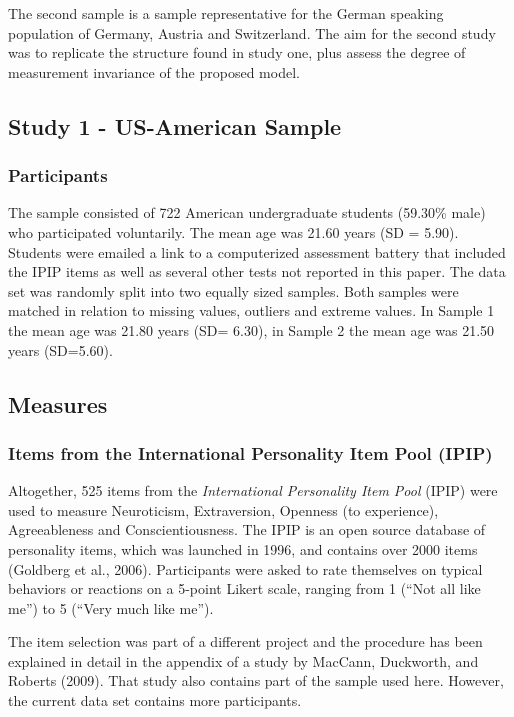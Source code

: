 \documentclass[,man,floatsintext]{apa6}
\begin{document}
The second sample is a sample representative for the German speaking
population of Germany, Austria and Switzerland. The aim for the second
study was to replicate the structure found in study one, plus assess the
degree of measurement invariance of the proposed model.

\subsection{Study 1 - US-American
Sample}\label{study-1---us-american-sample}

\subsubsection{Participants}\label{participants}

The sample consisted of 722 American undergraduate students (59.30\%
male) who participated voluntarily. The mean age was 21.60 years (SD =
5.90). Students were emailed a link to a computerized assessment battery
that included the IPIP items as well as several other tests not reported
in this paper. The data set was randomly split into two equally sized
samples. Both samples were matched in relation to missing values,
outliers and extreme values. In Sample 1 the mean age was 21.80 years
(SD= 6.30), in Sample 2 the mean age was 21.50 years (SD=5.60).

\subsection{Measures}\label{measures}

\subsubsection{Items from the International Personality Item Pool
(IPIP)}\label{items-from-the-international-personality-item-pool-ipip}

Altogether, 525 items from the \emph{International Personality Item
Pool} (IPIP) were used to measure Neuroticism, Extraversion, Openness
(to experience), Agreeableness and Conscientiousness. The IPIP is an
open source database of personality items, which was launched in 1996,
and contains over 2000 items (Goldberg et al., 2006). Participants were
asked to rate themselves on typical behaviors or reactions on a 5-point
Likert scale, ranging from 1 (\enquote{Not all like me}) to 5
(\enquote{Very much like me}).

The item selection was part of a different project and the procedure has
been explained in detail in the appendix of a study by MacCann,
Duckworth, and Roberts (2009). That study also contains part of the
sample used here. However, the current data set contains more
participants.
\end{document}
